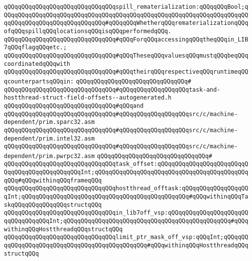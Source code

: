 \newline
\verb|qQQqqQQqqQQqqQQqqQQqqQQqqQQqqQQqspill_rematerialization:qQQqqQQqBool;qQQqqQQqqQQqqQQqqQQqqQQqqQQqqQQqqQQqqQQqqQQqqQQqqQQqqQQqqQQqqQQqqQQqqQQqqQQqqQQqqQQqqQQqqQQqqQQqqQQq#qQQqqQQqWhetherqQQqrematerializationqQQqofqQQqspillqQQqlocationsqQQqisqQQqperformedqQQq.|\newline
\newline
\verb|qQQqqQQqqQQqqQQqqQQqqQQqqQQqqQQq#qQQqForqQQqaccessingqQQqtheqQQqin_LIB7qQQqflagqQQqetc.;|\newline
\verb|qQQqqQQqqQQqqQQqqQQqqQQqqQQqqQQq#qQQqTheseqQQqvaluesqQQqmustqQQqbeqQQqcoordinatedqQQqwith|\newline
\verb|qQQqqQQqqQQqqQQqqQQqqQQqqQQqqQQq#qQQqtheirqQQqrespectiveqQQqruntimeqQQqcounterpartsqQQqin:|\newline
\verb|qQQqqQQqqQQqqQQqqQQqqQQqqQQqqQQq#|\newline
\verb|qQQqqQQqqQQqqQQqqQQqqQQqqQQqqQQq#qQQqqQQqqQQqqQQqqQQqtask-and-hostthread-struct-field-offsets--autogenerated.h|\newline
\verb|qQQqqQQqqQQqqQQqqQQqqQQqqQQqqQQq#qQQqand|\newline
\verb|qQQqqQQqqQQqqQQqqQQqqQQqqQQqqQQq#qQQqqQQqqQQqqQQqqQQqsrc/c/machine-dependent/prim.sparc32.asm|\newline
\verb|qQQqqQQqqQQqqQQqqQQqqQQqqQQqqQQq#qQQqqQQqqQQqqQQqqQQqsrc/c/machine-dependent/prim.intel32.asm|\newline
\verb|qQQqqQQqqQQqqQQqqQQqqQQqqQQqqQQq#qQQqqQQqqQQqqQQqqQQqsrc/c/machine-dependent/prim.pwrpc32.asm|\newline
\verb|qQQqqQQqqQQqqQQqqQQqqQQqqQQqqQQq#|\newline
\verb|qQQqqQQqqQQqqQQqqQQqqQQqqQQqqQQqtask_offset:qQQqqQQqqQQqqQQqqQQqqQQqqQQqqQQqqQQqqQQqqQQqqQQqInt;qQQqqQQqqQQqqQQqqQQqqQQqqQQqqQQqqQQqqQQqqQQqqQQq#qQQqwithinqQQqframeqQQq|\newline
\verb|qQQqqQQqqQQqqQQqqQQqqQQqqQQqqQQqhostthread_offtask:qQQqqQQqqQQqqQQqqQQqInt;qQQqqQQqqQQqqQQqqQQqqQQqqQQqqQQqqQQqqQQqqQQqqQQq#qQQqwithinqQQqTaskqQQqqQQqqQQqqQQqstructqQQq|\newline
\verb|qQQqqQQqqQQqqQQqqQQqqQQqqQQqqQQqin_lib7off_vsp:qQQqqQQqqQQqqQQqqQQqqQQqqQQqqQQqqQQqInt;qQQqqQQqqQQqqQQqqQQqqQQqqQQqqQQqqQQqqQQqqQQqqQQq#qQQqwithinqQQqHostthreadqQQqstructqQQq|\newline
\verb|qQQqqQQqqQQqqQQqqQQqqQQqqQQqqQQqlimit_ptr_mask_off_vsp:qQQqInt;qQQqqQQqqQQqqQQqqQQqqQQqqQQqqQQqqQQqqQQqqQQqqQQq#qQQqwithinqQQqHostthreadqQQqstructqQQq|\newline
